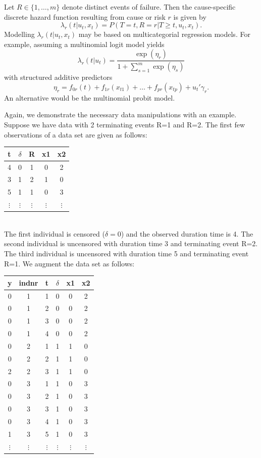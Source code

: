 \documentclass[11pt,a4paper,twoside]{bayesxarticle}
\begin{document}
Let $R \in \{1,\dots,m\}$ denote distinct events of failure. Then
the cause-specific discrete hazard function resulting from cause or
risk $r$ is given by
$$
\lambda_{r}(t|u_t,x_t) = P(T=t,R=r|T \geq t, u_t,x_t).
$$
Modelling $\lambda_{r}(t|u_t,x_t)$ may be based on multicategorial
regression models. For example, assuming a multinomial logit model
yields
$$
\lambda_{r}(t|u_t) = \frac{\exp(\eta_{r})}{1+\sum_{s=1}^m
\exp(\eta_s)}
$$
with structured additive predictors
\begin{equation}
\label{gampred3} \eta_{r}=f_{0r}(t) +
f_{1r}(x_{t1})+\dots+f_{pr}(x_{tp})+u_{t}'\gamma_r.
\end{equation}
An alternative would be the multinomial probit model.

Again, we demonstrate the necessary data manipulations with an
example. Suppose we have data with 2 terminating events R=1 and R=2.
The first few observations of a data set are given as follows:
\vspace{0.5cm}\\
\begin{tabular}{c|c|c|c|c}
t & $\delta$ & R & x1 & x2\\\hline\hline 4 & 0    &  1 & 0  &
2\\\hline 3 & 1    &  2 & 1  & 0\\\hline 5 & 1    &  1 & 0  &
3\\\hline
$\vdots$ & $\vdots$ & $\vdots$ & $\vdots$ & $\vdots$\\
\end{tabular}
\vspace{0.5cm}\\
The first individual is censored ($\delta=0$) and the observed
duration time is 4. The second individual is uncensored with
duration time 3 and terminating event R=2. The third individual is
uncensored with duration time 5 and terminating event R=1. We
augment the data set as follows:
\vspace{0.5cm}\\
\begin{tabular}{c|c|c|c|c|c}
y & indnr & t & $\delta$ &  x1 & x2\\\hline\hline
0 &  1  &  1 & 0  &  0 &  2\\
0 &  1  &  2 & 0  &  0 &  2\\
0 &  1  &  3 & 0  &  0 &  2\\
0 &  1  &  4 & 0  &  0 &  2\\\hline
0 &  2  &  1 & 1  &  1 &  0\\
0 &  2  &  2 & 1  &  1 &  0\\
2 &  2  &  3 & 1  &  1 &  0\\\hline
0 &  3  &  1 & 1  &  0 &  3\\
0 &  3  &  2 & 1  &  0 &  3\\
0 &  3  &  3 & 1  &  0 &  3\\
0 &  3  &  4 & 1  &  0 &  3\\
1 &  3  &  5 & 1  &  0 & 3\\\hline
$\vdots$ & $\vdots$ & $\vdots$ & $\vdots$ & $\vdots$ & $\vdots$\\
\end{tabular}
\end{document}
